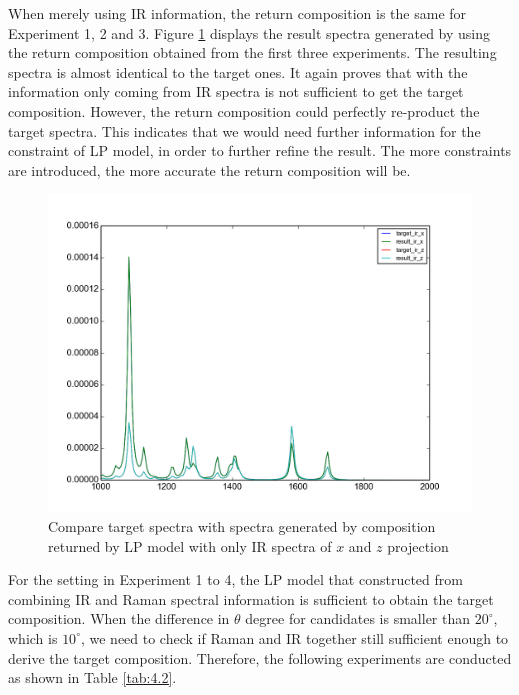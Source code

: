 When merely using IR information, the return composition is the same for Experiment 1, 2 and 3. Figure \ref{fig:4.1} displays the result spectra generated by using the return composition obtained from the first three experiments. The resulting spectra is almost identical to the target ones. It again proves that with the information only coming from IR spectra is not sufficient to get the target composition.  However, the return composition could perfectly re-product the target spectra. This indicates that we would need further information for the constraint of LP model, in order to further refine the result. The more constraints are introduced, the more accurate the return composition will be. \\

\begin{figure}[!ht] \label{fig:4.1}
\centering
\includegraphics[scale=0.5]{Figures/ir_xz_result_plotting.png}
\caption{Compare target spectra with spectra generated by composition returned by LP model with only IR spectra of $x$ and $z$ projection} 
\end{figure}

For the setting in Experiment 1 to 4, the LP model that constructed from combining IR and Raman spectral information is sufficient to obtain the target composition. When the difference in $\theta$ degree for candidates is smaller than $20^{\circ}$, which is $10^{\circ}$, we need to check if Raman and IR together still sufficient enough to derive the target composition. Therefore, the following experiments are conducted as shown in Table \ref{tab:4.2}. \\

